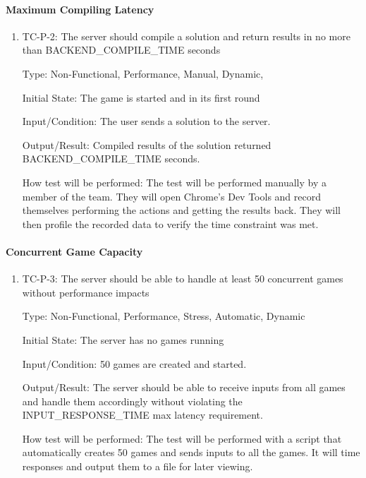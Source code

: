 \documentclass[12pt, titlepage]{article}
\begin{document}
\paragraph{Maximum Compiling Latency}

\begin{enumerate}
\item{TC-P-2: The server should compile a solution and return results in no more than BACKEND\_COMPILE\_TIME seconds}

Type: Non-Functional, Performance, Manual, Dynamic,
					
Initial State: The game is started and in its first round

Input/Condition: The user sends a solution to the server.
					
Output/Result: Compiled results of the solution returned BACKEND\_COMPILE\_TIME seconds.
					
How test will be performed: The test will be performed manually by a member of the team. They will open Chrome's Dev Tools and record themselves performing the actions and getting the results back. They will then profile the recorded data to verify the time constraint was met.
\end{enumerate}

\paragraph{Concurrent Game Capacity}

\begin{enumerate}

\item{TC-P-3: The server should be able to handle at least 50 concurrent games without performance impacts}

Type: Non-Functional, Performance, Stress, Automatic, Dynamic
					
Initial State: The server has no games running
					
Input/Condition: 50 games are created and started.
					
Output/Result: The server should be able to receive inputs from all games and handle them accordingly without violating the INPUT\_RESPONSE\_TIME max latency requirement.
					
How test will be performed: The test will be performed with a script that automatically creates 50 games and sends inputs to all the games. It will time responses and output them to a file for later viewing.

\end{enumerate}
\end{document}
